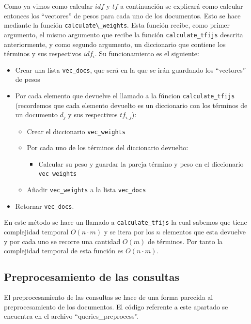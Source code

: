 \documentclass[runningheads]{llncs}
\begin{document}
	Como ya vimos como calcular $idf$ y $tf$ a continuaci\'on se explicar\'a como calcular entonces los ``vectores'' de pesos para cada uno de los documentos.  Esto se hace mediante la funci\'on \verb|calculate\_weights|. Esta funci\'on recibe, como primer argumento, el mismo argumento que recibe la funci\'on \verb|calculate_tfijs| descrita anteriormente, y como segundo argumento, un diccionario que contiene los t\'erminos y sus respectivos $idf_i$. Su funcionamiento es el siguiente:
	
	\begin{itemize}
		\item Crear una lista \verb|vec_docs|, que ser\'a en la que se ir\'an guardando los ``vectores'' de pesos
		\item Por cada elemento que devuelve el llamado a la f\'uncion \verb|calculate_tfijs| (recordemos que cada elemento devuelto es un diccionario con los t\'erminos de un documento $d_j$ y sus respectivos $tf_{i,j}$):
		\begin{itemize}
			\item Crear el diccionario \verb|vec_weights|
			\item Por cada uno de los t\'erminos del diccionario devuelto:
			\begin{itemize}
				\item Calcular su peso y guardar la pareja t\'ermino y peso en el diccionario \verb|vec_weights|
			\end{itemize}
			\item A\~{n}adir \verb|vec_weights| a la lista \verb|vec_docs|
		\end{itemize}
		\item Retornar \verb|vec_docs|.
	\end{itemize}
	
	En este m\'etodo se hace un llamado a \verb|calculate_tfijs| la cual sabemos que tiene complejidad temporal $O(n\cdot m)$ y se itera por los $n$ elementos que esta devuelve y por cada uno se recorre una cantidad $O(m)$ de t\'erminos. Por tanto la complejidad temporal de esta funci\'on es $O(n\cdot m)$.
	
	\subsection{Preprocesamiento de las consultas}
	
	El preprocesamiento de las consultas se hace de una forma parecida al preprocesamiento de los documentos. El c\'odigo referente a este apartado se encuentra en el archivo ``queries\_preprocess''.
	
\end{document}
